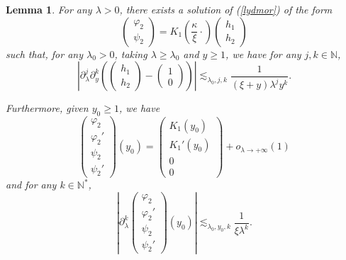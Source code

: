 \documentclass[11 pt]{amsart}
\newtheorem{lem}{Lemma}[section]
\theoremstyle{definition}
\theoremstyle{remark}
\numberwithin{equation}{section}
\begin{document}
\begin{lem}
  \label{factexp}For any $\lambda > 0$, there exists a solution of
  (\ref{lydmor}) of the form
  \[ \left(\begin{array}{c}
       \varphi_2\\
       \psi_2
     \end{array}\right) =  K_1 \left( \frac{\kappa}{\xi} \cdot \right)
     \left(\begin{array}{c}
       h_1\\
       h_2
     \end{array}\right) \]
such that, for any $\lambda_0 > 0$, taking $\lambda \geqslant \lambda_0$ and
  $y \geqslant 1$, we have for any $j, k \in \mathbb{N}$,
  \[ \left| \partial_{\lambda}^j \partial_y^k \left( \left(\begin{array}{c}
       h_1\\
       h_2
     \end{array}\right) - \left(\begin{array}{c}
       1\\
       0
     \end{array}\right) \right) \right| \lesssim_{\lambda_0, j, k}
     \frac{1}{(\xi + y) \lambda^j y^k} . \]
     
  Furthermore, given $y_0 \geqslant 1$, we have
  \[ \left(\begin{array}{c}
       \varphi_2\\
       \varphi_2'\\
       \psi_2\\
       \psi_2'
     \end{array}\right) (y_0) =   
     \left(\begin{array}{c}
       K_1 \left(y_0 \right)\\
       K_1' \left(y_0 \right)\\
       0\\
       0
     \end{array}\right) + o_{\lambda \rightarrow + \infty} (1)  \]
and for any $k \in \mathbb{N}^{\ast}$,
  \[ \left| \partial_{\lambda}^k \left(\begin{array}{c}
       \varphi_2\\
       \varphi_2'\\
       \psi_2\\
       \psi_2'
     \end{array}\right) (y_0) \right| \lesssim_{\lambda_0, y_0, k}
     \frac{1}{\xi \lambda^k} . \]
\end{lem}
\end{document}
